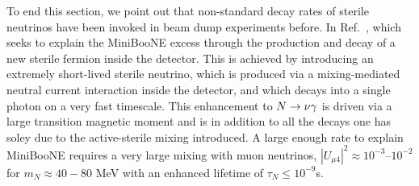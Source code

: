 \documentclass[11pt, a4paper]{article}
\newcommand{\refref}[1]{Ref.~\cite{#1}}
\def\ster{\ensuremath N}
\begin{document}
To end this section, we point out that non-standard decay rates of sterile
neutrinos have been invoked in beam dump experiments before. In
\refref{Gninenko:2009ks,Gninenko:2010pr}, which seeks to explain the MiniBooNE
excess through the production and decay of a new sterile fermion inside the
detector. This is achieved by introducing an extremely short-lived sterile
neutrino, which is produced via a mixing-mediated neutral current interaction
inside the detector, and which decays into a single photon on a very fast
timescale. This enhancement to $\ster\to \nu \gamma$ is driven via a large
transition magnetic moment and is in addition to all the decays one has soley
due to the active-sterile mixing introduced. A large enough rate to explain
MiniBooNE requires a very large mixing with muon neutrinos, $|U_{\mu 4}|^2
\approx 10^{-3}$--$10^{-2}$  for $m_N \approx 40-80$ MeV with an enhanced
lifetime of $\tau_N \leq 10^{-9}$s.
\end{document}
